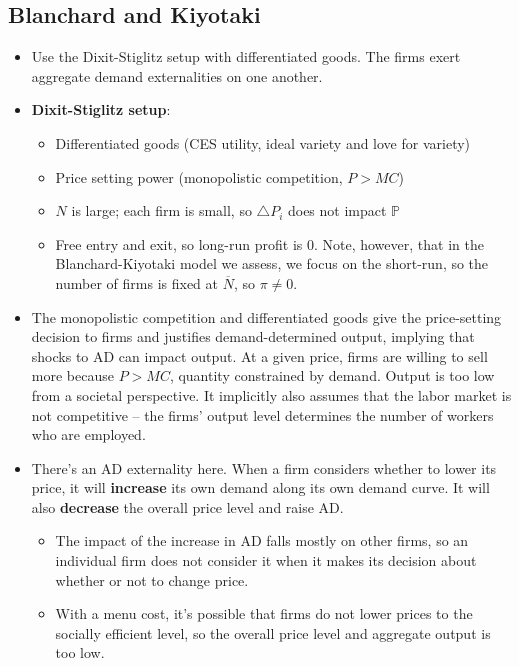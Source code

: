 \documentclass[12pt]{article}
\begin{document}
\subsection{Blanchard and Kiyotaki}

\begin{itemize}
    \item Use the Dixit-Stiglitz setup with differentiated goods. The firms exert aggregate demand externalities on one another.
    \item \textbf{Dixit-Stiglitz setup}: 
    \begin{itemize}
        \item Differentiated goods (CES utility, ideal variety and love for variety)
        \item Price setting power (monopolistic competition, $P > MC$)
        \item $N$ is large; each firm is small, so $\triangle P_i$ does not impact $\mathbb{P}$
        \item Free entry and exit, so long-run profit is 0. Note, however, that in the Blanchard-Kiyotaki model we assess, we focus on the short-run, so the number of firms is fixed at $\overline{N}$, so $\pi \neq 0$.
    \end{itemize}
    \item The monopolistic competition and differentiated goods give the price-setting decision to firms and justifies demand-determined output, implying that shocks to AD can impact output. At a given price, firms are willing to sell more because $P>MC$, quantity constrained by demand. Output is too low from a societal perspective. It implicitly also assumes that the labor market is not competitive -- the firms' output level determines the number of workers who are employed.
    \item There's an AD externality here. When a firm considers whether to lower its price, it will \textbf{increase} its own demand along its own demand curve. It will also \textbf{decrease} the overall price level and raise AD. 
    \begin{itemize}
        \item The impact of the increase in AD falls mostly on other firms, so an individual firm does not consider it when it makes its decision about whether or not to change price. 
        \item With a menu cost, it's possible that firms do not lower prices to the socially efficient level, so the overall price level and aggregate output is too low.
    \end{itemize}

\end{itemize}
\end{document}
